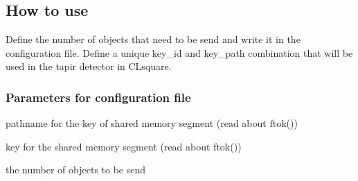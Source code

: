 \subsection{How to use}
\label{sec:mosm:howto}

Define the number of objects that need to be send and write it in the 
configuration file. Define a unique key\_id and key\_path combination 
that will be used in the tapir detector in CLsquare.

\subsubsection{Parameters for configuration file}
\label{sec:mosm:howto:params}

    \begin{description} \itemindent=-15pt
        \item[key\_path] pathname for the key of shared memory segment 
                (read about ftok())
        \item[key\_id] key for the shared memory segment (read about ftok())
        \item[nb\_objects] the number of objects to be send
    \end{description}
